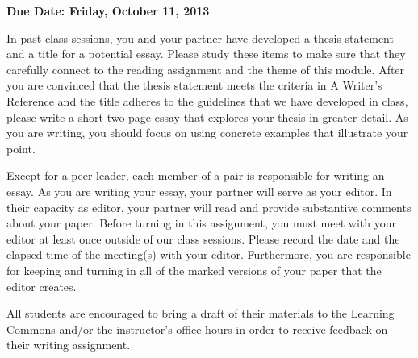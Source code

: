 

\usepackage[compact]{titlesec}



\vspace*{-.2in}
\begin{center}
	{\bf Due Date: Friday, October 11, 2013}
\end{center}

In past class sessions, you and your partner have developed a thesis statement and a title for a potential essay. Please
study these items to make sure that they carefully connect to the reading assignment and the theme of this module.
After you are convinced that the thesis statement meets the criteria in A Writer's Reference and the title adheres to
the guidelines that we have developed in class, please write a short two page essay that explores your thesis in greater
detail. As you are writing, you should focus on using concrete examples that illustrate your point.

Except for a peer leader, each member of a pair is responsible for writing an essay. As you are writing your essay, your
partner will serve as your editor.  In their capacity as editor, your partner will read and provide substantive comments
about your paper. Before turning in this assignment, you must meet with your editor at least once outside of our class
sessions. Please record the date and the elapsed time of the meeting(s) with your editor. Furthermore, you are
responsible for keeping and turning in all of the marked versions of your paper that the editor creates.

All students are encouraged to bring a draft of their materials to the Learning Commons and/or the instructor's office
hours in order to receive feedback on their writing assignment.


